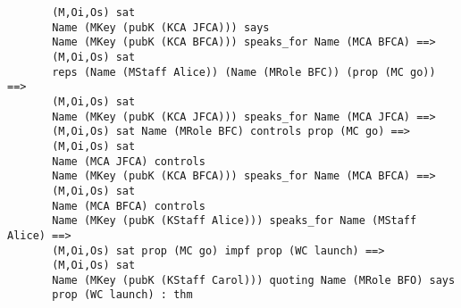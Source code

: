 \documentclass[10pt,twoside]{article}
\begin{document}
\begin{session}
\begin{scriptsize}
\begin{verbatim}
       (M,Oi,Os) sat
       Name (MKey (pubK (KCA JFCA))) says
       Name (MKey (pubK (KCA BFCA))) speaks_for Name (MCA BFCA) ==>
       (M,Oi,Os) sat
       reps (Name (MStaff Alice)) (Name (MRole BFC)) (prop (MC go)) ==>
       (M,Oi,Os) sat
       Name (MKey (pubK (KCA JFCA))) speaks_for Name (MCA JFCA) ==>
       (M,Oi,Os) sat Name (MRole BFC) controls prop (MC go) ==>
       (M,Oi,Os) sat
       Name (MCA JFCA) controls
       Name (MKey (pubK (KCA BFCA))) speaks_for Name (MCA BFCA) ==>
       (M,Oi,Os) sat
       Name (MCA BFCA) controls
       Name (MKey (pubK (KStaff Alice))) speaks_for Name (MStaff Alice) ==>
       (M,Oi,Os) sat prop (MC go) impf prop (WC launch) ==>
       (M,Oi,Os) sat
       Name (MKey (pubK (KStaff Carol))) quoting Name (MRole BFO) says
       prop (WC launch) : thm
\end{verbatim}
  \end{scriptsize}
\end{session}
\end{document}
